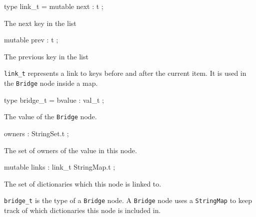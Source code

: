 \documentclass[11pt]{article}
\begin{document}
\label{type:Key.link-underscoret}\begin{ocamldoccode}
type link_t = {}
  mutable next : t ;
\end{ocamldoccode}
\begin{ocamldoccomment}
The next key in the list
\end{ocamldoccomment}
\begin{ocamldoccode}
  mutable prev : t ;
\end{ocamldoccode}
\begin{ocamldoccomment}
The previous key in the list
\end{ocamldoccomment}
\begin{ocamldoccode}
{}
\end{ocamldoccode}
\begin{ocamldocdescription}
{\tt{link\_t}} represents a link to keys before and after the current item.
    It is used in the {\tt{Bridge}} node inside a map.


\end{ocamldocdescription}




\label{type:Key.bridge-underscoret}\begin{ocamldoccode}
type bridge_t = {}
  bvalue : val_t ;
\end{ocamldoccode}
\begin{ocamldoccomment}
The value of the {\tt{Bridge}} node.
\end{ocamldoccomment}
\begin{ocamldoccode}
  owners : StringSet.t ;
\end{ocamldoccode}
\begin{ocamldoccomment}
The set of owners of the value
                     in this node.
\end{ocamldoccomment}
\begin{ocamldoccode}
  mutable links : link_t StringMap.t ;
\end{ocamldoccode}
\begin{ocamldoccomment}
The set of
                dictionaries which this node is linked to.
\end{ocamldoccomment}
\begin{ocamldoccode}
{}
\end{ocamldoccode}
\begin{ocamldocdescription}
{\tt{bridge\_t}} is the type of a {\tt{Bridge}} node. A {\tt{Bridge}} node uses a
    {\tt{StringMap}} to keep track of which dictionaries this node is included
    in.


\end{ocamldocdescription}
\end{document}
